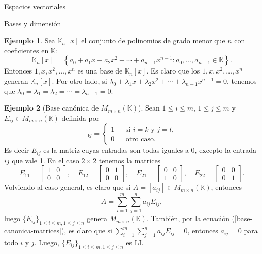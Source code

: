 \documentclass[a4paper,12pt,twoside,spanish,reqno]{amsbook}
\theoremstyle{definition}
\newtheorem{ejemplo}{Ejemplo}[section]
\theoremstyle{remark}
\newcommand{\K}{\mathbb K}
\begin{document}
\begin{chapter}{Espacios vectoriales}
\begin{section}{Bases y dimensión}
\begin{ejemplo}
	Sea $\K_n[x]$  el conjunto de polinomios de grado menor  que $n$ con coeficientes en $\K$:
	$$
	\K_n[x] = \left\{a_0 + a_1 x + a_2x^2+\cdots+a_{n-1}x^{n-1}: a_0,\ldots,a_{n-1} \in \K  \right\}.
	$$
	Entonces $1,x,x^2,\ldots,x^n$  es una base de $\K_n[x]$. Es claro que los $1,x,x^2,\ldots,x^n$ generan $\K_n[x]$. Por otro lado, si  $\lambda_0 + \lambda_1 x + \lambda_2x^2+\cdots+\lambda_{n-1}x^{n-1} =0$, tenemos que $\lambda_0=\lambda_1 = \lambda_2 =\cdots =\lambda_{n-1} =0$.
\end{ejemplo}

\begin{ejemplo}[{\sc Base canónica de $M_{m \times n}(\K)$}] 
	Sean $1 \le i \le m$, $1\le j \le m$ y $E_{ij} \in M_{m \times n}(\K)$ definida por
	\begin{equation*}
		[E_{ij}]_{kl} = \left\{ 
		\begin{array}{lll}
		1& &\text{si $i=k$ y $j=l$,} \\
		0& &\text{otro caso}. 
		\end{array}
		 \right.
	\end{equation*}
	Es decir $E_{ij}$  es la matriz cuyas entradas son todas iguales a 0,  excepto la entrada $ij$ que vale 1. En el caso $2 \times 2$  tenemos la matrices
	\begin{equation*}
		E_{11} = \begin{bmatrix} 1&0\\0&0\end{bmatrix}, \quad
		E_{12} = \begin{bmatrix} 0&1\\0&0\end{bmatrix}, \quad
		E_{21} = \begin{bmatrix} 0&0\\1&0\end{bmatrix}, \quad
		E_{22} = \begin{bmatrix} 0&0\\0&1\end{bmatrix}.
	\end{equation*}
	Volviendo al caso general,  es claro que si $A= [a_{ij}] \in M_{m \times n}(\K)$,  entonces
	\begin{equation}\label{base-canonica-matrices}
		A = \sum_{i=1}^{m} \sum_{j=1}^{n} a_{ij}E_{ij},
	\end{equation}
	luego $\{E_{ij} \}_{1 \le i \le m, 1\le j \le n}$ genera $M_{m \times n}(\K)$. También, por la ecuación (\ref{base-canonica-matrices}), es claro que si $\sum_{i=1}^{m} \sum_{j=1}^{n} a_{ij}E_{ij}=0$,  entonces $a_{ij}=0$ para todo $i$ y $j$. Luego,  $\{E_{ij} \}_{1 \le i \le m, 1\le j \le n}$ es LI. 
	

\end{ejemplo}
\end{section}
\end{chapter}
\end{document}
